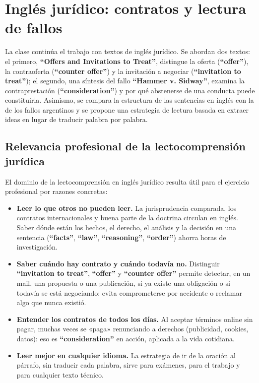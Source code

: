 \documentclass[12pt,oneside]{book}
\begin{document}
\chapter{Inglés jurídico: contratos y lectura de fallos}

La clase continúa el trabajo con textos de inglés jurídico. Se abordan dos textos: el primero, \textbf{``Offers and Invitations to Treat''}, distingue la oferta (\textbf{``offer''}), la contraoferta (\textbf{``counter offer''}) y la invitación a negociar (\textbf{``invitation to treat''}); el segundo, una síntesis del fallo \textbf{``Hammer v. Sidway''}, examina la contraprestación (\textbf{``consideration''}) y por qué abstenerse de una conducta puede constituirla. Asimismo, se compara la estructura de las sentencias en inglés con la de los fallos argentinos y se propone una estrategia de lectura basada en extraer ideas en lugar de traducir palabra por palabra.

\section*{Relevancia profesional de la lectocomprensión jurídica}

El dominio de la lectocomprensión en inglés jurídico resulta útil para el ejercicio profesional por razones concretas:

\begin{itemize}
    \item \textbf{Leer lo que otros no pueden leer.} La jurisprudencia comparada, los contratos internacionales y buena parte de la doctrina circulan en inglés. Saber dónde están los hechos, el derecho, el análisis y la decisión en una sentencia (\textbf{``facts''}, \textbf{``law''}, \textbf{``reasoning''}, \textbf{``order''}) ahorra horas de investigación.
    \item \textbf{Saber cuándo hay contrato y cuándo todavía no.} Distinguir \textbf{``invitation to treat''}, \textbf{``offer''} y \textbf{``counter offer''} permite detectar, en un mail, una propuesta o una publicación, si ya existe una obligación o si todavía se está negociando: evita comprometerse por accidente o reclamar algo que nunca existió.
    \item \textbf{Entender los contratos de todos los días.} Al aceptar términos online sin pagar, muchas veces se «paga» renunciando a derechos (publicidad, cookies, datos): eso es \textbf{``consideration''} en acción, aplicada a la vida cotidiana.
    \item \textbf{Leer mejor en cualquier idioma.} La estrategia de ir de la oración al párrafo, sin traducir cada palabra, sirve para exámenes, para el trabajo y para cualquier texto técnico.
\end{itemize}
\end{document}
